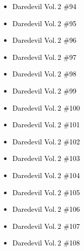 \documentclass[12pt]{article}
\newcommand{\checkbox}{\raisebox{0.0ex}{\fbox{\rule{0ex}{1.5ex} \rule{1.5ex}{0ex}}}}
\begin{document}
\vspace{0.3cm}
\noindent
\begin{tcolorbox}[
  colback=white!95!gray,
  colframe=black,
  width=\textwidth,
  arc=4mm,
  auto outer arc,
  boxrule=0.8pt,
  left=8pt,right=8pt,top=8pt,bottom=8pt
]
\begin{itemize}[left=0pt,label={\checkbox}]
    \item \textcolor{black}{Daredevil Vol.\,2 \#94}
    \item \textcolor{black}{Daredevil Vol.\,2 \#95}
    \item \textcolor{black}{Daredevil Vol.\,2 \#96}
    \item \textcolor{black}{Daredevil Vol.\,2 \#97}
    \item \textcolor{black}{Daredevil Vol.\,2 \#98}
    \item \textcolor{black}{Daredevil Vol.\,2 \#99}
    \item \textcolor{black}{Daredevil Vol.\,2 \#100}
    \item \textcolor{black}{Daredevil Vol.\,2 \#101}
    \item \textcolor{black}{Daredevil Vol.\,2 \#102}
    \item \textcolor{black}{Daredevil Vol.\,2 \#103}
    \item \textcolor{black}{Daredevil Vol.\,2 \#104}
    \item \textcolor{black}{Daredevil Vol.\,2 \#105}
    \item \textcolor{black}{Daredevil Vol.\,2 \#106}
    \item \textcolor{black}{Daredevil Vol.\,2 \#107}
    \item \textcolor{black}{Daredevil Vol.\,2 \#108}
\end{itemize}
\end{tcolorbox}
\end{document}
